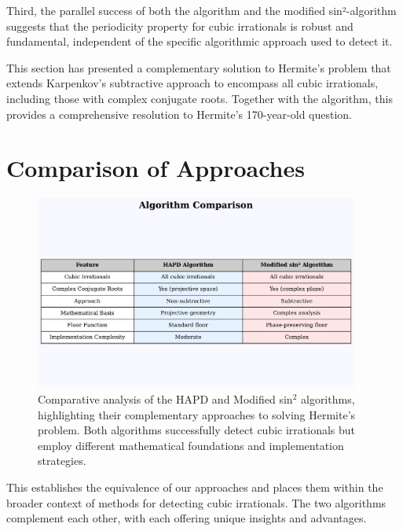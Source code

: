 Third, the parallel success of both the \HAPD{} algorithm and the modified sin²-algorithm suggests that the periodicity property for cubic irrationals is robust and fundamental, independent of the specific algorithmic approach used to detect it.

This section has presented a complementary solution to Hermite's problem that extends Karpenkov's subtractive approach to encompass all cubic irrationals, including those with complex conjugate roots. Together with the \HAPD{} algorithm, this provides a comprehensive resolution to Hermite's 170-year-old question.

\section{Comparison of Approaches}\label{sec:comparison}

\begin{figure}[ht]
\centering
\includegraphics[width=0.95\textwidth]{figures/output/algorithm_comparison_chart.pdf}
\caption{Comparative analysis of the HAPD and Modified sin$^2$ algorithms, highlighting their complementary approaches to solving Hermite's problem. Both algorithms successfully detect cubic irrationals but employ different mathematical foundations and implementation strategies.}
\label{fig:algorithm_comparison}
\end{figure}

This establishes the equivalence of our approaches and places them within the broader context of methods for detecting cubic irrationals. The two algorithms complement each other, with each offering unique insights and advantages. 